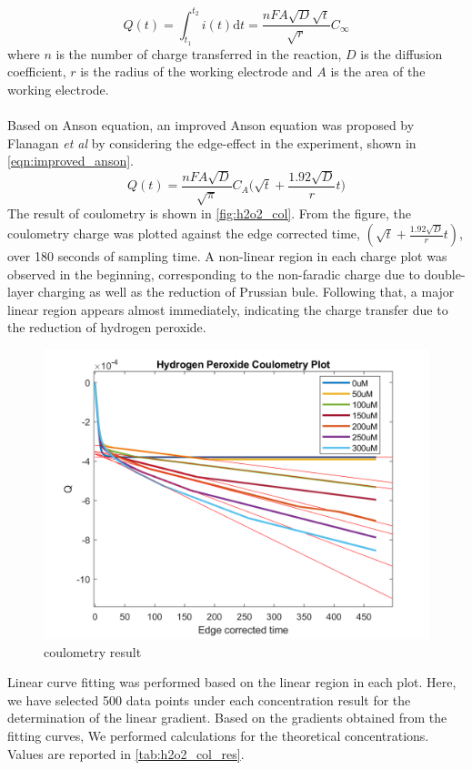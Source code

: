 \begin{equation}\label{eqn:anson}
    Q(t) = \int_{t_{1}}^{t_{2}}i(t) \mathrm{d}t = \frac{nFA\sqrt{D}\sqrt{t}}{\sqrt{r}}C_{\infty}
\end{equation}
where $n$ is the number of charge transferred in the reaction, $D$ is the diffusion coefficient, $r$ is the radius of the working electrode and $A$ is the area of the working electrode.\\\\
Based on Anson equation, an improved Anson equation was proposed by Flanagan \textit{et al} \cite{Flanagan1973} by considering the edge-effect in the experiment, shown in \autoref{eqn:improved_anson}.
\begin{equation}\label{eqn:improved_anson}
    Q(t) = \frac{nFA\sqrt{D}}{\sqrt{\pi}}C_{A}\bigg( \sqrt{t}+\frac{1.92\sqrt{D}}{r}t\bigg)
\end{equation}
The result of coulometry is shown in \autoref{fig:h2o2_col}. From the figure, the coulometry charge was plotted against the edge corrected time, $(\sqrt{t}+\frac{1.92\sqrt{D}}{r}t)$, over 180 seconds of sampling time. A non-linear region in each charge plot was observed in the beginning, corresponding to the non-faradic charge due to double-layer charging as well as the reduction of Prussian bule. Following that, a major linear region appears almost immediately, indicating the charge transfer due to the reduction of hydrogen peroxide.
\begin{figure}[H]
    \centering
    \includegraphics[width=.5\textwidth]{img/h2o2_coulometry.png}
    \caption{coulometry result}
    \label{fig:h2o2_col}
\end{figure}\vspace{-.8cm}
\noindent Linear curve fitting was performed based on the linear region in each plot. Here, we have selected 500 data points under each concentration result for the determination of the linear gradient. Based on the gradients obtained from the fitting curves,  We performed calculations for the theoretical concentrations. Values are reported in \autoref{tab:h2o2_col_res}.
